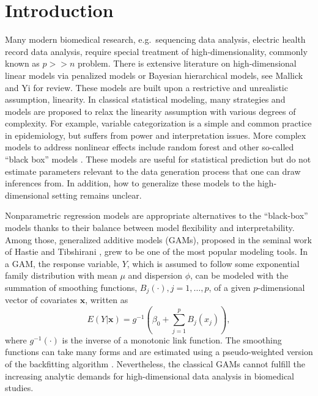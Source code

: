 \documentclass[AMA,STIX1COL,]{WileyNJD-v2}
\begin{document}
\pgfplotsset{compat=1.18}
\usetikzlibrary{shapes.geometric, arrows, positioning, calc, matrix, backgrounds, fit}
\newcommand{\bs}[1]{\boldsymbol{#1}}
\newcommand{\tp}{*}
\newcommand{\pr}{\text{Pr}}
\newcommand{\repa}{\text{repa}}
\newcommand{\simiid}{\overset{\text{iid}}{\sim}}

\hypertarget{introduction}{%
\section{Introduction}\label{introduction}}

\label{sec:intro}

Many modern biomedical research, e.g.~sequencing data analysis, electric
health record data analysis, require special treatment of
high-dimensionality, commonly known as \(p >> n\) problem. There is
extensive literature on high-dimensional linear models via penalized
models or Bayesian hierarchical models, see Mallick and Yi
\citep{Mallick2013} for review. These models are built upon a
restrictive and unrealistic assumption, linearity. In classical
statistical modeling, many strategies and models are proposed to relax
the linearity assumption with various degrees of complexity. For
example, variable categorization is a simple and common practice in
epidemiology, but suffers from power and interpretation issues. More
complex models to address nonlinear effects include random forest and
other so-called ``black box'' models \citep{Breiman2001}. These models
are useful for statistical prediction but do not estimate parameters
relevant to the data generation process that one can draw inferences
from. In addition, how to generalize these models to the
high-dimensional setting remains unclear.

Nonparametric regression models are appropriate alternatives to the
``black-box'' models thanks to their balance between model flexibility
and interpretability. Among those, generalized additive models (GAMs),
proposed in the seminal work of Hastie and Tibshirani
\citep{Hastie1987}, grew to be one of the most popular modeling tools.
In a GAM, the response variable, \(Y\), which is assumed to follow some
exponential family distribution with mean \(\mu\) and dispersion
\(\phi\), can be modeled with the summation of smoothing functions,
\(B_j(\cdot), j = 1, \dots, p\), of a given \(p\)-dimensional vector of
covariates \(\boldsymbol{x}\), written as \[
 E(Y|\boldsymbol{x}) = g^{-1}(\beta_0 + \sum\limits^p_{j=1}B_j(x_j)),
\] where \(g^{-1}(\cdot)\) is the inverse of a monotonic link function.
The smoothing functions can take many forms and are estimated using a
pseudo-weighted version of the backfitting algorithm
\citep{Breiman1985}. Nevertheless, the classical GAMs cannot fulfill the
increasing analytic demands for high-dimensional data analysis in
biomedical studies.
\end{document}
